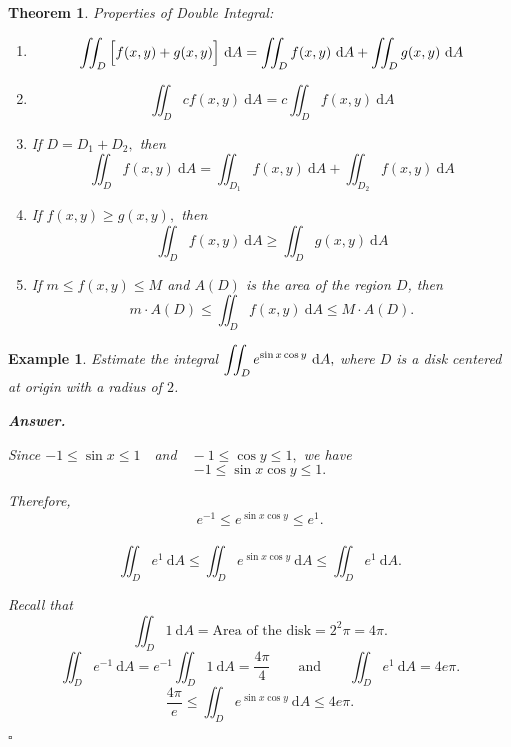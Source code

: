 \documentclass[12pt,a4paper]{article}
\newtheorem{thm}{Theorem}[subsection]
\newtheorem{eg}{Example}[subsection]
\newenvironment*{ans}{\par\indent\textbf{\textit{Answer. }}\par}{\par\hfill{$\square$}\par}
\def\dsst{\displaystyle}
\def\d{{\mathrm{d}}}
\def\iintD{\dsst\iint_D}
\begin{document}
\begin{thm}Properties of Double Integral:
\begin{enumerate}
	\item \[\iintD\qty\Big[f(x,y)+g(x,y)]\ \d A=\iintD f(x,y)\ \d A+\iintD g(x,y)\ \d A\]
	\item \[\iintD cf(x,y)\ \d A=c\iintD f(x,y)\ \d A\]
	\item If $D=D_1+D_2,$ then \[\iintD f(x,y)\ \d A=\iint_{D_1}f(x,y)\ \d A+\iint_{D_2}f(x,y)\ \d A\]
	\item If $f(x,y)\geq g(x,y),$ then \[\iintD f(x,y)\ \d A\geq \iintD g(x,y)\ \d A\]
	\item If $m\leq f(x,y)\leq M$ and $A(D)$ is the area of the region $D$, then \[m\cdot A(D)\leq\iintD f(x,y)\ \d A\leq M\cdot A(D).\]
\end{enumerate}	
\end{thm}
\begin{eg}
	Estimate the integral $\displaystyle\iintD e^{\sin{x}\cos{y}}\ \d A,$ where $D$ is a disk centered at origin with a radius of $2$.
	\begin{ans}
		Since $-1\leq\sin{x}\leq1\quad$and$\quad-1\leq\cos{y}\leq1,$ we have \[-1\leq\sin{x}\cos{y}\leq1.\]\par Therefore, \[e^{-1}\leq e^{\sin{x}\cos{y}}\leq e^{1}.\]\ \[\iintD e^{1}\ \d A\leq\iintD e^{\sin{x}\cos{y}}\ \d A\leq\iintD e^1\ \d A.\]\par Recall that \[\iintD 1\ \d A=\text{Area of the disk}=2^2\pi=4\pi.\] \[\iint_D e^{-1}\ \d A=e^{-1}\iintD 1\ \d A=\dfrac{4\pi}{4}\qquad\text{and}\qquad\iintD e^{1}\ \d A=4e\pi.\] \[\dfrac{4\pi}{e}\leq\iintD e^{\sin{x}\cos{y}}\ \d A\leq 4e\pi.\]
	\end{ans}
\end{eg}
\end{document}
